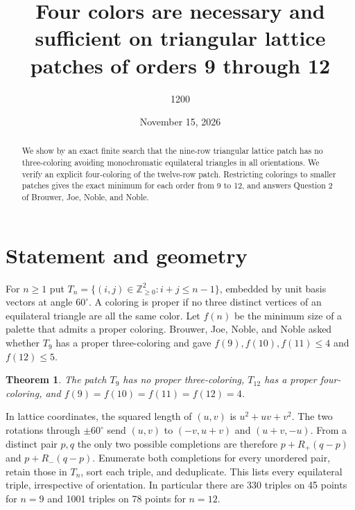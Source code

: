 \documentclass[11pt]{amsart}
\title[Four colors on triangular lattice patches]{Four colors are necessary and sufficient on triangular lattice patches of orders 9 through 12}
\author{1200}
\date{November 15, 2026}
\newtheorem{theorem}{Theorem}
\begin{document}
\begin{abstract}
We show by an exact finite search that the nine-row triangular lattice patch has no three-coloring avoiding monochromatic equilateral triangles in all orientations. We verify an explicit four-coloring of the twelve-row patch. Restricting colorings to smaller patches gives the exact minimum for each order from 9 to 12, and answers Question 2 of Brouwer, Joe, Noble, and Noble.
\end{abstract}
\maketitle
\section{Statement and geometry}
For $n\ge1$ put $T_n=\{(i,j)\in\mathbb Z_{\ge0}^2:i+j\le n-1\}$, embedded by unit basis vectors at angle $60^\circ$. A coloring is proper if no three distinct vertices of an equilateral triangle are all the same color. Let $f(n)$ be the minimum size of a palette that admits a proper coloring. Brouwer, Joe, Noble, and Noble \cite{BJN} asked whether $T_9$ has a proper three-coloring and gave $f(9),f(10),f(11)\le 4$ and $f(12)\le 5$.
\begin{theorem}
The patch $T_9$ has no proper three-coloring, $T_{12}$ has a proper four-coloring, and $f(9)=f(10)=f(11)=f(12)=4$.
\end{theorem}
In lattice coordinates, the squared length of $(u,v)$ is $u^2+uv+v^2$. The two rotations through $\pm60^\circ$ send $(u,v)$ to $(-v,u+v)$ and $(u+v,-u)$. From a distinct pair $p,q$ the only two possible completions are therefore $p+R_+(q-p)$ and $p+R_-(q-p)$. Enumerate both completions for every unordered pair, retain those in $T_n$, sort each triple, and deduplicate. This lists every equilateral triple, irrespective of orientation. In particular there are 330 triples on 45 points for $n=9$ and 1001 triples on 78 points for $n=12$.
\end{document}
